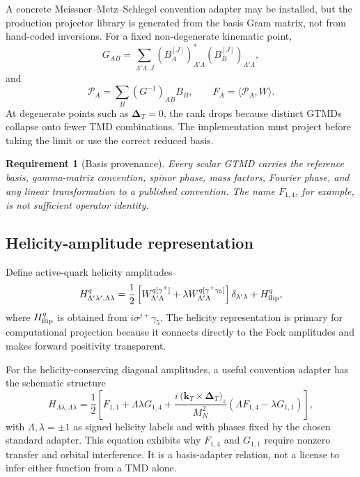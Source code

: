 \documentclass[11pt]{article}
\newtheorem{requirement}[definition]{Requirement}
\newcommand{\kT}{\bm{k}_{T}}
\newcommand{\DT}{\bm{\Delta}_{T}}
\newcommand{\cP}{\mathcal P}
\newcommand{\crossT}[2]{\bigl(#1\!\times\!#2\bigr)_z}
\begin{document}
A concrete Meissner--Metz--Schlegel convention adapter may be installed, but
the production projector library is generated from the basis Gram matrix,
not from hand-coded inversions.  For a fixed non-degenerate kinematic point,
\begin{equation}
 G_{AB}=\sum_{\Lambda'\Lambda,J}
 \left(B_A^{[J]}\right)_{\Lambda'\Lambda}^*
 \left(B_B^{[J]}\right)_{\Lambda'\Lambda},
\label{eq:gtmd-gram}
\end{equation}
and
\begin{equation}
 \cP_A=\sum_B(G^{-1})_{AB}B_B,
 \qquad
 F_A=\langle\cP_A,W\rangle.
\label{eq:gtmd-projector}
\end{equation}
At degenerate points such as \(\DT=0\), the rank drops because distinct GTMDs
collapse onto fewer TMD combinations.  The implementation must project
before taking the limit or use the correct reduced basis.

\begin{requirement}[Basis provenance]
\label{req:basis-provenance}
Every scalar GTMD carries the reference basis, gamma-matrix convention,
spinor phase, mass factors, Fourier phase, and any linear transformation to a
published convention.  The name \(F_{1,4}\), for example, is not sufficient
operator identity.
\end{requirement}

\subsection{Helicity-amplitude representation}

Define active-quark helicity amplitudes
\begin{equation}
 H^q_{\Lambda'\lambda',\Lambda\lambda}
 =\frac12\left[
 W^{q[\gamma^+]}_{\Lambda'\Lambda}
 +\lambda W^{q[\gamma^+\gamma_5]}_{\Lambda'\Lambda}
 \right]\delta_{\lambda'\lambda}
 +H^q_{\rm flip},
\label{eq:quark-helicity-amplitudes}
\end{equation}
where \(H^q_{\rm flip}\) is obtained from
\(i\sigma^{j+}\gamma_5\).  The helicity representation is primary for
computational projection because it connects directly to the Fock amplitudes
and makes forward positivity transparent.

For the helicity-conserving diagonal amplitudes, a useful convention adapter
has the schematic structure
\begin{equation}
 H_{\Lambda\lambda,\Lambda\lambda}
 =\frac12\left[
 F_{1,1}+\Lambda\lambda G_{1,4}
 +\frac{i\,\crossT{\kT}{\DT}}{M_N^2}
 \left(\Lambda F_{1,4}-\lambda G_{1,1}\right)
 \right],
\label{eq:f14-g11-helicity}
\end{equation}
with \(\Lambda,\lambda=\pm1\) as signed helicity labels and with phases fixed
by the chosen standard adapter.  This equation exhibits why \(F_{1,4}\) and
\(G_{1,1}\) require nonzero transfer and orbital interference.  It is a
basis-adapter relation, not a license to infer either function from a TMD
alone.
\end{document}
